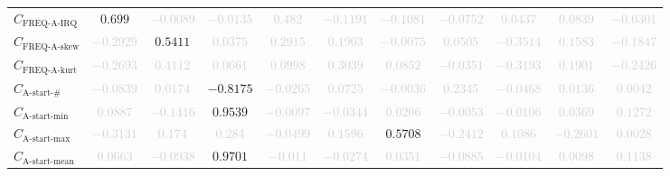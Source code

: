 \documentclass{standalone}
\newcommand{\startactivitiesname}{\text{A-start-\#}}
\newcommand{\startactivities}{C_{\startactivitiesname}}
\newcommand{\startminname}{\text{A-start-min}}
\newcommand{\startmin}{C_{\startminname}}
\newcommand{\startmaxname}{\text{A-start-max}}
\newcommand{\startmax}{C_{\startmaxname}}
\newcommand{\startmeanname}{\text{A-start-mean}}
\newcommand{\startmean}{C_{\startmeanname}}
\newcommand{\actfreqiqrname}{\text{FREQ-A-IRQ}}
\newcommand{\actfreqiqr}{C_{\actfreqiqrname}}
\newcommand{\actfreqskewname}{\text{FREQ-A-skew}}
\newcommand{\actfreqskew}{C_{\actfreqskewname}}
\newcommand{\actfreqkurtname}{\text{FREQ-A-kurt}}
\newcommand{\actfreqkurt}{C_{\actfreqkurtname}}
\begin{document}
\begin{tabular}{lcccccccccc}
$\actfreqiqr$ & $0.699$ & \textcolor{lightgray}{$-0.0089$} & \textcolor{lightgray}{$-0.0135$} & \textcolor{lightgray}{$0.482$} & \textcolor{lightgray}{$-0.1191$} & \textcolor{lightgray}{$-0.1081$} & \textcolor{lightgray}{$-0.0752$} & \textcolor{lightgray}{$0.0437$} & \textcolor{lightgray}{$0.0839$} & \textcolor{lightgray}{$-0.0301$} \\ 
$\actfreqskew$ & \textcolor{lightgray}{$-0.2929$} & $0.5411$ & \textcolor{lightgray}{$0.0375$} & \textcolor{lightgray}{$0.2915$} & \textcolor{lightgray}{$0.1903$} & \textcolor{lightgray}{$-0.0075$} & \textcolor{lightgray}{$0.0505$} & \textcolor{lightgray}{$-0.3514$} & \textcolor{lightgray}{$0.1583$} & \textcolor{lightgray}{$-0.1847$} \\ 
$\actfreqkurt$ & \textcolor{lightgray}{$-0.2693$} & \textcolor{lightgray}{$0.4112$} & \textcolor{lightgray}{$0.0661$} & \textcolor{lightgray}{$0.0998$} & \textcolor{lightgray}{$0.3039$} & \textcolor{lightgray}{$0.0852$} & \textcolor{lightgray}{$-0.0351$} & \textcolor{lightgray}{$-0.3193$} & \textcolor{lightgray}{$0.1901$} & \textcolor{lightgray}{$-0.2426$} \\ 
$\startactivities$ & \textcolor{lightgray}{$-0.0839$} & \textcolor{lightgray}{$0.0174$} & $-0.8175$ & \textcolor{lightgray}{$-0.0265$} & \textcolor{lightgray}{$0.0725$} & \textcolor{lightgray}{$-0.0036$} & \textcolor{lightgray}{$0.2345$} & \textcolor{lightgray}{$-0.0468$} & \textcolor{lightgray}{$0.0136$} & \textcolor{lightgray}{$0.0042$} \\ 
$\startmin$ & \textcolor{lightgray}{$0.0887$} & \textcolor{lightgray}{$-0.1416$} & $0.9539$ & \textcolor{lightgray}{$-0.0097$} & \textcolor{lightgray}{$-0.0344$} & \textcolor{lightgray}{$0.0206$} & \textcolor{lightgray}{$-0.0053$} & \textcolor{lightgray}{$-0.0106$} & \textcolor{lightgray}{$0.0369$} & \textcolor{lightgray}{$0.1272$} \\ 
$\startmax$ & \textcolor{lightgray}{$-0.3131$} & \textcolor{lightgray}{$0.174$} & \textcolor{lightgray}{$0.284$} & \textcolor{lightgray}{$-0.0499$} & \textcolor{lightgray}{$0.1596$} & $0.5708$ & \textcolor{lightgray}{$-0.2412$} & \textcolor{lightgray}{$0.1086$} & \textcolor{lightgray}{$-0.2601$} & \textcolor{lightgray}{$0.0028$} \\ 
$\startmean$ & \textcolor{lightgray}{$0.0663$} & \textcolor{lightgray}{$-0.0938$} & $0.9701$ & \textcolor{lightgray}{$-0.011$} & \textcolor{lightgray}{$-0.0274$} & \textcolor{lightgray}{$0.0351$} & \textcolor{lightgray}{$-0.0885$} & \textcolor{lightgray}{$-0.0104$} & \textcolor{lightgray}{$0.0098$} & \textcolor{lightgray}{$0.1138$} \\ 

\end{tabular}
\end{document}
